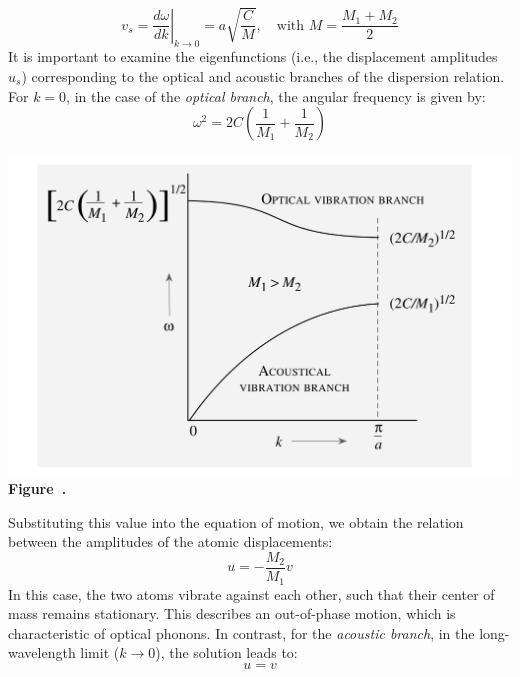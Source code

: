 \begin{equation}
	v_s = \left. \frac{d\omega}{dk} \right|_{k \to 0} = a \sqrt{\frac{C}{M}}, \quad \text{with } M = \frac{M_1 + M_2}{2}
\end{equation}
It is important to examine the eigenfunctions (i.e., the displacement amplitudes \( u_s \)) corresponding to the optical and acoustic branches of the dispersion relation.
For \( k = 0 \), in the case of the \textit{optical branch}, the angular frequency is given by:
\begin{equation}
	\omega^2 = 2C \left( \frac{1}{M_1} + \frac{1}{M_2} \right)
\end{equation}
\begin{center}
	\begin{minipage}{0.8\textwidth}
		\centering
		\includegraphics[width=\textwidth]{img/OpticalVSAcoustic_differences.png}
		\\[0.5em]
		\textbf{Figure~\thefigure.}
		\label{fig:OpticalVSAcoustic_differences}
	\end{minipage}
\end{center}
Substituting this value into the equation of motion, we obtain the relation between the amplitudes of the atomic displacements:
\begin{equation}
	u = -\frac{ M_2}{M_1} v
\end{equation}
In this case, the two atoms vibrate against each other, such that their center of mass remains stationary. This describes an out-of-phase motion, which is characteristic of optical phonons.
In contrast, for the \textit{acoustic branch}, in the long-wavelength limit (\( k \to 0 \)), the solution leads to:
\begin{equation}
	u = v
\end{equation}

